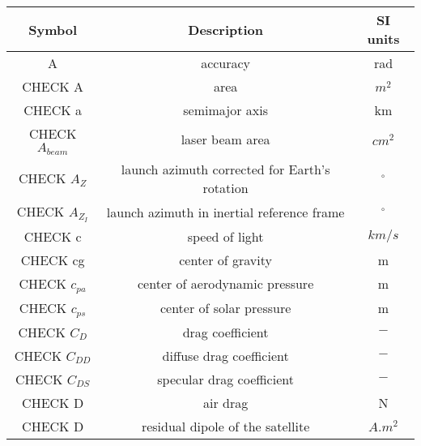 \begin{center}
\begin{longtable}{c|c|c}

\textbf{Symbol} & \textbf{Description} & \textbf{SI units} \\\hline\hline
A																		& accuracy 																		& rad \\

CHECK A																		& area 																				& $m^2$ \\

CHECK a																		& semimajor axis 															& km \\

CHECK $A_{beam}$                        & laser beam area                               & $cm^2$ \\

CHECK $A_Z$                           & launch azimuth corrected for Earth's rotation  & $^\circ$ \\

CHECK $A_{Z_I}$                           & launch azimuth in inertial reference frame  & $^\circ$ \\

CHECK c                                     & speed of light                            & $km/s$ \\

CHECK cg                                    & center of gravity                         & m \\

CHECK $c_{pa}$                              & center of aerodynamic pressure            & m \\

CHECK $c_{ps}$                             & center of solar pressure                   & m \\

CHECK $C_D$																& drag coefficient 														& $-$ \\

CHECK $C_{DD}$													        & diffuse drag coefficient														& $-$ \\

CHECK $C_{DS}$						       								& specular drag coefficient 														& $-$ \\

CHECK D																		& air drag 																		& N \\

CHECK D                                 & residual dipole of the satellite               & $A.m^2$ \\


\end{longtable}
\end{center}
